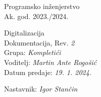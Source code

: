 \documentclass[12pt]{report}
\begin{document}
 
		
		
		
		\begin{titlepage}
			\begin{center}
				\LARGE Programsko inženjerstvo\\
				\large Ak. god. 2023./2024.\\
				
				
				\huge Digitalizacija\\
				\Large Dokumentacija, Rev. \textit{2}\\
				
				\normalsize
				Grupa: \textit{Kompletići}\\
				Voditelj: \textit{Martin Ante Rogošić}\\
				
				
				Datum predaje: \textit{19. 1. 2024.}\\
				
				
				Nastavnik: \textit{Igor Stančin}\\
				
			\end{center}
			
			
		\end{titlepage}
		
		
		\tableofcontents
		
		
		
		
		
		
		
		
		
		
		
		\begingroup
		\renewcommand*\listfigurename{Indeks slika i dijagrama}
		\listoffigures
		\endgroup
		
		
		
		\eject 
		
		
		
	
\end{document}
